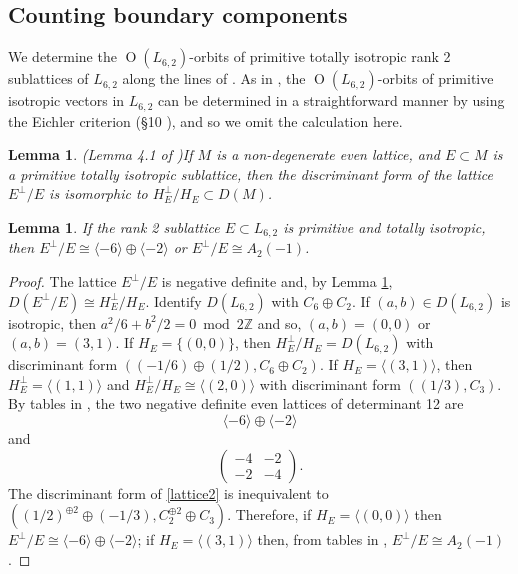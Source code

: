 \documentclass[11pt]{amsart}
\newtheorem{lem}[thm]{Lemma}
\newcommand{\ZZ}{\mathbb{Z}}
\newcommand{\la}{\langle}
\newcommand{\ra}{\rangle}
\newcommand{\opn}{\operatorname}
\newcommand{\op}{\oplus}
\begin{document}
\subsection{Counting boundary components}
We determine the $\opn{O}(L_{6, 2})$-orbits of primitive totally isotropic rank 2 sublattices of $L_{6,2}$ along the lines of \cite{scattone}.
As in \cite{scattone}, the $\opn{O}(L_{6,2})$-orbits of primitive isotropic vectors in $L_{6,2}$ can be determined in a straightforward manner by using the Eichler criterion (\S10 \cite{eichler}), and so we omit the calculation here.
\begin{lem}{(Lemma 4.1 of \cite{zbMATH03832089})}\label{Eperpdisc} 
 If $M$ is a non-degenerate even lattice, and $E \subset M$ is a primitive totally isotropic sublattice, then the discriminant form of the lattice $E^{\perp} / E$ is isomorphic to $H_E^{\perp}/H_E \subset D(M)$.
\end{lem}
\begin{lem}\label{HE}
If the rank 2 sublattice $E \subset L_{6,2}$ is primitive and totally isotropic, then
$E^{\perp}/E \cong \la -6 \ra \op \la -2 \ra$ or $E^{\perp}/E \cong A_2(-1)$.
\end{lem}
\begin{proof}
The lattice $E^{\perp}/E$ is negative definite and, by Lemma \ref{Eperpdisc}, $D(E^{\perp}/E) \cong H_E^{\perp}/H_E$.
Identify $D(L_{6,2})$ with $C_6 \op C_2$. 
If $(a,b) \in D(L_{6,2})$ is isotropic, then $a^2 / 6 + b^2 / 2 = 0 \bmod{2 \ZZ}$ and so, $(a,b)=(0,0)$ or $(a,b) = (3,1)$. 
If $H_E = \{ (0,0) \}$, then $H_E^{\perp}/H_E = D(L_{6,2})$ with discriminant form $((-1/6) \op (1/2), C_6 \op C_2)$. 
If $H_E = \la (3,1) \ra$, then $H_E^{\perp} = \la (1,1) \ra$ and $H_E^{\perp}/H_E \cong \la (2,0) \ra$ with discriminant form $( (1/3), C_3)$. 
By tables in \cite{SPLAG}, the two negative definite even lattices of determinant 12 are 
\begin{equation*}
\la -6 \ra \op \la -2 \ra
\end{equation*}
and 
\begin{equation}\label{lattice2}
\begin{pmatrix}
-4 & -2 \\ 
-2 & -4 
\end{pmatrix}.
\end{equation}
The discriminant form of \eqref{lattice2} is inequivalent to $( (1/2)^{\op 2} \op (-1/3), C_2^{\op 2} \op C_3)$. 
Therefore, if $H_E = \la (0,0) \ra$ then $E^{\perp} / E \cong \la -6 \ra \op \la -2 \ra$; 
if $H_E = \la (3,1) \ra$ then, from tables in \cite{SPLAG}, $E^{\perp}/E \cong A_2(-1)$.
\end{proof}
\end{document}
